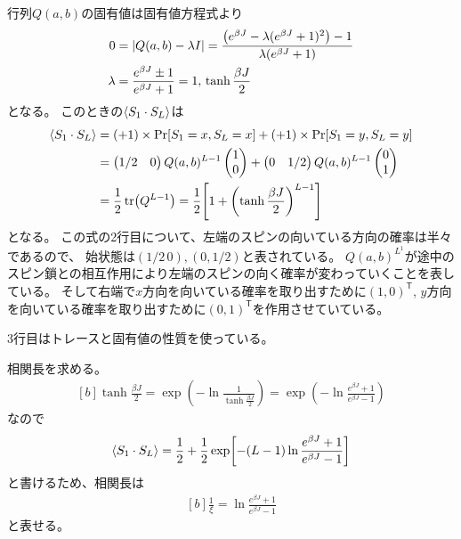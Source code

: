 \documentclass[../../sp_2018.tex]{subfiles}
\begin{document}
\subsection{}
行列\(Q(a,b)\)の固有値は固有値方程式より
\begin{equation}\begin{aligned}[b]
    0 &= \abs{Q(a,b)-\lambda I} = \frac{\qty(e^{\beta J}-\lambda(e^{\beta J}+1)^2)-1}{\lambda(e^{\beta J}+1)}\\
    \lambda &=\frac{e^{\beta J}\pm 1}{e^{\beta J}+1} = 1,\,\tanh\frac{\beta J}{2}
\end{aligned}\end{equation}
となる。
このときの\(\ev{S_1\cdot S_L}\)は
\begin{equation}\begin{aligned}[b]
    \ev{S_1\cdot S_L}
    &=(+1)\times \Pr[S_1=x,S_L=x]
    +(+1)\times \Pr[S_1=y,S_L=y]\\
    &=\begin{pmatrix}
        1/2 & 0
    \end{pmatrix}Q(a,b)^{L-1}\begin{pmatrix}
        1 \\ 0
    \end{pmatrix}+\begin{pmatrix}
        0 & 1/2
    \end{pmatrix}Q(a,b)^{L-1}\begin{pmatrix}
        0 \\ 1
    \end{pmatrix}\\
    &= \frac{1}{2}\tr(Q^{L-1})
    = \frac{1}{2}\qty[1+\qty(\tanh\frac{\beta J}{2})^{L-1}]
\end{aligned}\end{equation}
となる。
この式の2行目について、左端のスピンの向いている方向の確率は半々であるので、
始状態は\((1/2\,0),(0,1/2)\)と表されている。
\(Q(a,b)^{L^1}\)が途中のスピン鎖との相互作用により左端のスピンの向く確率が変わっていくことを表している。
そして右端で\(x\)方向を向いている確率を取り出すために\((1,0)^\mathsf{T}\),
\(y\)方向を向いている確率を取り出すために\((0,1)^\mathsf{T}\)を作用させていている。

3行目はトレースと固有値の性質を使っている。

相関長を求める。
\begin{equation}\begin{aligned}[b]
    \tanh\frac{\beta J}{2} = \exp(-\ln\frac{1}{\tanh\frac{\beta J}{2}})
    =\exp(-\ln\frac{e^{\beta J}+1}{e^{\beta J}-1})
\end{aligned}\end{equation}
なので
\begin{equation}\begin{aligned}[b]
    \ev{S_1\cdot S_L} = \frac{1}{2}+\frac{1}{2}\exp[-(L-1)\ln\frac{e^{\beta J}+1}{e^{\beta J}-1}]
\end{aligned}\end{equation}
と書けるため、相関長は
\begin{equation}\begin{aligned}[b]
    \frac{1}{\xi} = \ln\frac{e^{\beta J}+1}{e^{\beta J}-1}
\end{aligned}\end{equation}
と表せる。
\end{document}
